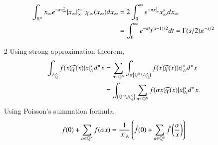 \documentclass[a4paper, 12pt]{article}
\theoremstyle{Mydefinition}
\theoremstyle{Mytheorem}
\begin{document}
\begin{enumerate}
        \begin{equation}
    \begin{split}
        \int_{\mathbb{R}^\times} x_\infty e^{-\pi x_\infty^2}\abs{x_\infty}_{\infty}^{s-1} \chi_\infty(x_\infty)dx_\infty &= 2\int_0^\infty e^{-\pi x_\infty^2} x_\infty^{s}dx_\infty\\
        &=\int_0^\infty e^{-\pi t} t^{(s-1)/2}dt = \Gamma(s/2)\pi^{-s/2}
    \end{split}
    \end{equation}
    
    \item[2]
    Using strong approximation theorem,
    \begin{equation}
    \begin{split}
        \int_{\mathbb{A}_\mathbb{Q}^\times} f(x)\widetilde{\chi}(x)\abs{x}_{\mathbb{A}}^s d^\times x &=\sum_{\alpha\in \mathbb{Q}^\times} \int_{\alpha\left(\mathbb{Q}^\times\backslash \mathbb{A}_\mathbb{Q}^\times\right)} f(x)\widetilde{\chi}(x)\abs{x}_{\mathbb{A}}^s d^\times x\\
        &=\int_{\left(\mathbb{Q}^\times\backslash \mathbb{A}_\mathbb{Q}^\times\right)} \sum_{\alpha\in \mathbb{Q}^\times}f(\alpha x)\widetilde{\chi}(x)\abs{x}_{\mathbb{A}}^s d^\times x.
    \end{split}
    \end{equation}
    Using Poisson's summation formula,
    \begin{equation}
        f(0) + \sum_{\alpha\in \mathbb{Q}^\times}f(\alpha x) = \frac{1}{\abs{x}_\mathbb{A}}\left(\hat{f}(0) + \sum_{\alpha\in \mathbb{Q}^\times}\hat{f}\left(\frac{\alpha}{x}\right)\right)
    \end{equation}
    

\end{enumerate}
\end{document}
